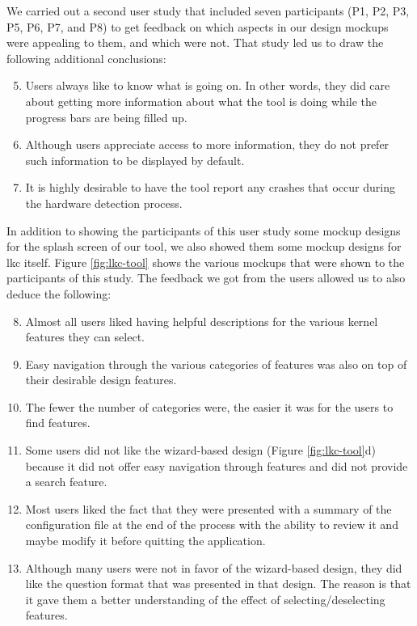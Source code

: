 \documentclass{chi2009}
\begin{document}
We carried out a second user study that included seven participants (P1, P2, P3, P5, P6, P7, and P8) to get feedback on which aspects in our design mockups were
appealing to them, and which were not. That study led us to draw the following additional conclusions:
\begin{enumerate}
 \setcounter{enumi}{4}
 \item Users always like to know what is going on. In other words, they did care about getting more information about what the tool is doing while the progress
bars are being filled up.
 \item Although users appreciate access to more information, they do not prefer such information to be displayed by default.
 \item It is highly desirable to have the tool report any crashes that occur during the hardware detection process.
\end{enumerate}

In addition to showing the participants of this user study some mockup designs for the splash screen of our tool, we also showed them some mockup designs
for \textsf{lkc} itself. Figure \ref{fig:lkc-tool} shows the various mockups that were shown to the participants of this study. The feedback we got from the
users allowed us to also deduce the following:
\begin{enumerate}
 \setcounter{enumi}{7}
 \item Almost all users liked having helpful descriptions for the various kernel features they can select.
 \item Easy navigation through the various categories of features was also on top of their desirable design features.
 \item The fewer the number of categories were, the easier it was for the users to find features.
 \item Some users did not like the wizard-based design (Figure \ref{fig:lkc-tool}d) because it did not offer easy navigation through features and did not
provide a search feature.
 \item Most users liked the fact that they were presented with a summary of the configuration file at the end of the process with the ability to review it and
maybe modify it before quitting the application.
 \item Although many users were not in favor of the wizard-based design, they did like the question format that was presented in that design. The reason is
that it gave them a better understanding of the effect of selecting/deselecting features.
\end{enumerate}
\end{document}
